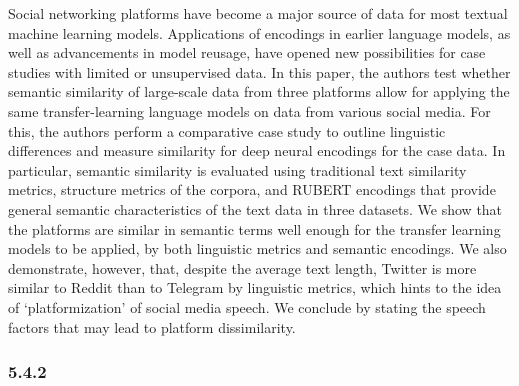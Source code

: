 Social networking platforms have become a major source of data for most textual machine learning models. Applications of encodings in earlier language models, as well as advancements in model reusage, have opened new possibilities for case studies with limited or unsupervised data. In this paper, the authors test whether semantic similarity of large-scale data from three platforms allow for applying the same transfer-learning language models on data from various social media. For this, the authors perform a comparative case study to outline linguistic differences and measure similarity for deep neural encodings for the case data. In particular, semantic similarity is evaluated using traditional text similarity metrics, structure metrics of the corpora, and RUBERT encodings that provide general semantic characteristics of the text data in three datasets. We show that the platforms are similar in semantic terms well enough for the transfer learning models to be applied, by both linguistic metrics and semantic encodings. We also demonstrate, however, that, despite the average text length, Twitter is more similar to Reddit than to Telegram by linguistic metrics, which hints to the idea of ‘platformization’ of social media speech. We conclude by stating the speech factors that may lead to platform dissimilarity.

\subsubsection{5.4.2}

